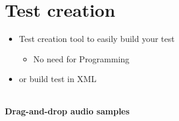 
\section{Test creation} %

\begin{itemize}
	\item Test creation tool to easily build your test
	\begin{itemize}
		\item No need for Programming
	\end{itemize}
	\item or build test in XML
\end{itemize}

\begin{center}
\\ %
\small
\textbf{Drag-and-drop audio samples}
\end{center}
